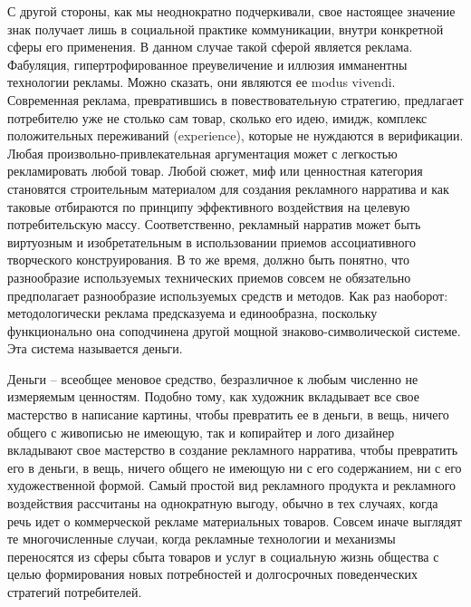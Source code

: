 С другой стороны, как мы неоднократно подчеркивали, свое настоящее значение
знак получает лишь в социальной практике коммуникации, внутри конкретной
сферы его применения. В данном случае такой сферой является реклама. Фабуляция,
гипертрофированное преувеличение и иллюзия имманентны технологии рекламы. Можно
сказать, они являются ее modus vivendi. Современная реклама, превратившись в
повествовательную стратегию, предлагает потребителю уже не столько сам товар,
сколько его идею, имидж, комплекс положительных переживаний (experience),
которые не нуждаются в верификации. Любая произвольно-привлекательная аргументация
может с легкостью рекламировать любой товар. Любой сюжет, миф или ценностная
категория становятся строительным материалом для создания рекламного нарратива
и как таковые отбираются  по принципу эффективного воздействия на целевую
потребительскую массу. Соответственно, рекламный нарратив может быть виртуозным
и изобретательным в использовании приемов ассоциативного творческого
конструирования. В то же время, должно быть понятно, что разнообразие
используемых технических приемов совсем не обязательно предполагает разнообразие
используемых средств и методов. Как раз наоборот: методологически реклама
предсказуема и единообразна, поскольку функционально она соподчинена другой
мощной знаково-символической системе. Эта система называется деньги.

Деньги -- всеобщее меновое средство, безразличное к любым численно не
измеряемым ценностям. Подобно тому, как художник вкладывает все свое мастерство
в написание картины, чтобы превратить ее в деньги, в вещь, ничего общего с
живописью не имеющую, так и копирайтер и лого дизайнер вкладывают свое
мастерство в создание рекламного  нарратива, чтобы превратить его в деньги,
в вещь, ничего общего не имеющую ни с его  содержанием, ни с его художественной
формой. Самый простой вид рекламного продукта и рекламного воздействия
рассчитаны на однократную выгоду, обычно в тех случаях, когда речь идет о
коммерческой рекламе материальных товаров.  Совсем иначе выглядят те
многочисленные случаи, когда рекламные технологии и механизмы переносятся из
сферы сбыта товаров и услуг в социальную жизнь общества с целью формирования
новых потребностей и долгосрочных поведенческих стратегий потребителей.

